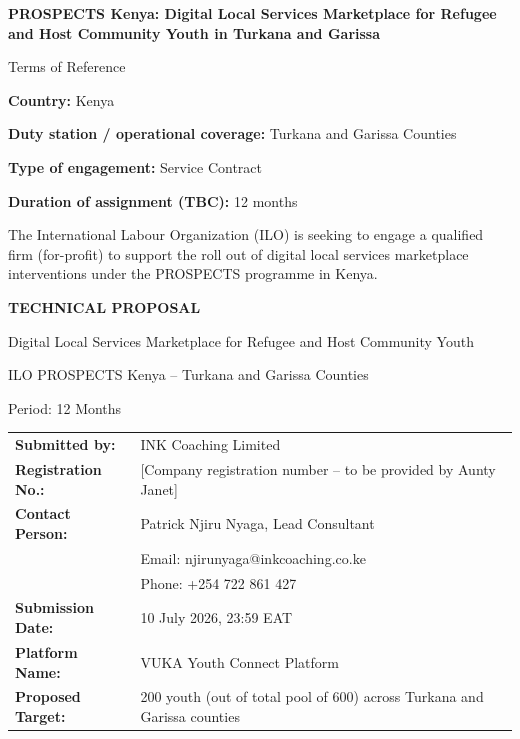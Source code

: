 \documentclass[11pt,a4paper]{article}
\begin{document}
\begin{titlepage}
    \centering
    \vspace*{2cm}
    
    {\LARGE\bfseries PROSPECTS Kenya: Digital Local Services Marketplace for Refugee and Host Community Youth in Turkana and Garissa\par}
    \vspace{0.5cm}
    {\large Terms of Reference\par}
    \vspace{1cm}
    
    {\large
    \textbf{Country:} Kenya\par
    \textbf{Duty station / operational coverage:} Turkana and Garissa Counties\par
    \textbf{Type of engagement:} Service Contract\par
    \textbf{Duration of assignment (TBC):} 12 months\par
    }
    
    \vspace{1cm}
    
    {\large The International Labour Organization (ILO) is seeking to engage a qualified firm (for-profit) to support the roll out of digital local services marketplace interventions under the PROSPECTS programme in Kenya.\par}
    
    \vspace{1cm}
    
    {\large\bfseries TECHNICAL PROPOSAL\par}
    {\large Digital Local Services Marketplace for Refugee and Host Community Youth\par}
    {\large ILO PROSPECTS Kenya -- Turkana and Garissa Counties\par}
    {\large Period: 12 Months\par}
    
    \vspace{1cm}
    
    \begin{tabular}{ll}
    \textbf{Submitted by:} & INK Coaching Limited \\
    \textbf{Registration No.:} & [Company registration number -- to be provided by Aunty Janet] \\
    \textbf{Contact Person:} & Patrick Njiru Nyaga, Lead Consultant \\
    & Email: njirunyaga@inkcoaching.co.ke \\
    & Phone: +254 722 861 427 \\
    \textbf{Submission Date:} & 10 July 2026, 23:59 EAT \\
    \textbf{Platform Name:} & VUKA Youth Connect Platform \\
    \textbf{Proposed Target:} & 200 youth (out of total pool of 600) across Turkana and Garissa counties \\
    \end{tabular}
    

\end{titlepage}
\end{document}
